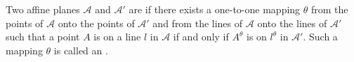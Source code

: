Two affine planes $\mathcal{A}$ and $\mathcal{A}'$ are  if there exists a one-to-one mapping $\theta$ from the points of $\mathcal{A}$ onto the points of $\mathcal{A}'$ and from the lines of $\mathcal{A}$ onto the lines of $\mathcal{A}'$ such that a point $A$ is on a line $l$ in $\mathcal{A}$ if and only if $A^\theta$ is on $l^\theta$ in $\mathcal{A}'$. Such a mapping $\theta$ is called an .
